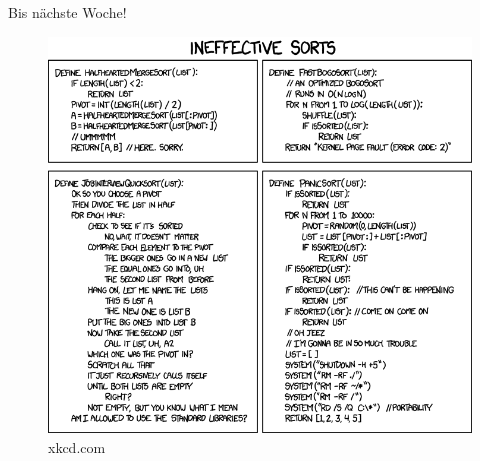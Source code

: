 \documentclass[18pt]{beamer}
\begin{document}
\begin{frame}{Bis nächste Woche!}
    \begin{figure}
        \includegraphics[scale=.3]{img/ineffective_sorts.png}
        \caption{\footnotesize{xkcd.com}}
    \end{figure}
\end{frame}

\backupend
\end{document}
